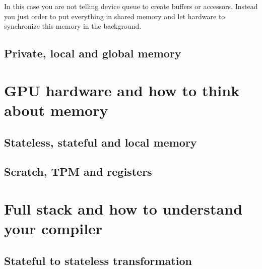 \documentclass[a4paper,12pt,oneside]{article}
\begin{document}
In this case you are not telling device queue to create buffers or accessors. Instead you just order to put everything in shared memory and let hardware to synchronize this memory in the background.

\subsection{Private, local and global memory}\label{subsec:PrivLocal}


\section{GPU hardware and how to think about memory}\label{sec:GPUHW}


\subsection{Stateless, stateful and local memory}\label{subsec:StatelessFull}


\subsection{Scratch, TPM and registers}\label{subsec:ScratchTPM}


\section{Full stack and how to understand your compiler}\label{sec:Compiler}


\subsection{Stateful to stateless transformation}\label{subsec:ToStateless}
\end{document}
